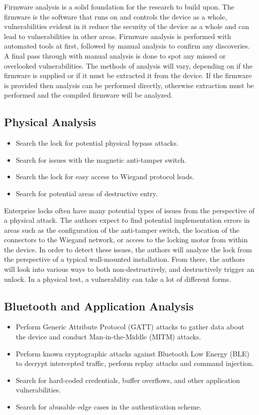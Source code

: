 \documentclass[10pt,twocolumn,letterpaper]{article}
\begin{document}
Firmware analysis is a solid foundation for the research to build upon.  The firmware is the software that runs on and controls the device as a whole, vulnerabilities evident in it reduce the security of the device as a whole and can lead to vulnerabilities in other areas.  Firmware analysis is performed with automated tools at first, followed by manual analysis to confirm any discoveries.  A final pass through with manual analysis is done to spot any missed or overlooked vulnerabilities.  The methods of analysis will vary, depending on if the firmware is supplied or if it must be extracted it from the device.  If the firmware is provided then analysis can be performed directly, otherwise extraction must be performed and the compiled firmware will be analyzed.

\subsection{Physical Analysis}
\begin{itemize}
    \item Search the lock for potential physical bypass attacks.
    \item Search for issues with the magnetic anti-tamper switch.
    \item Search the lock for easy access to Wiegand protocol leads.
    \item Search for potential areas of destructive entry.
\end{itemize}

Enterprise locks often have many potential types of issues from the perspective of a physical attack.  The authors expect to find potential implementation errors in areas such as the configuration of the anti-tamper switch, the location of the connectors to the Wiegand network, or access to the locking motor from within the device.  In order to detect these issues, the authors will analyze the lock from the perspective of a typical wall-mounted installation.  From there, the authors will look into various ways to both non-destructively, and destructively trigger an unlock.  In a physical test, a vulnerability can take a lot of different forms.  

\subsection{Bluetooth and Application Analysis}
\begin{itemize}
    \item Perform Generic Attribute Protocol (GATT) attacks to gather data about the device and conduct Man-in-the-Middle (MITM) attacks. 
    \item Perform known cryptographic attacks against Bluetooth Low Energy (BLE) to decrypt intercepted traffic, perform replay attacks and command injection.
    \item Search for hard-coded credentials, buffer overflows, and other application vulnerabilities. 
    \item Search for abusable edge cases in the authentication scheme.
\end{itemize}
\end{document}
